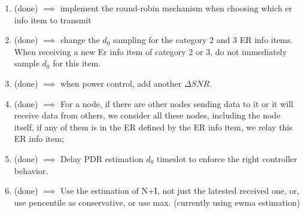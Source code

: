 \begin{enumerate}
\item (done) $\implies$ implement the round-robin mechanism when choosing which er info item to transmit
\item (done) $\implies$ change the $d_0$ sampling for the category 2 and 3 ER info items. When receiving a new Er info item of category 2 or 3, do not immediately sample $d_0$ for this item.
\item (done) $\implies$ when power control, add another $\Delta SNR$.
\item (done) $\implies$ For a node, if there are other nodes sending data to it or it will receive data from others, we consider all these nodes, including the node itself, if any of them is in the ER defined by the ER info item, we relay this ER info item;
\item (done) $\implies$ Delay PDR estimation $d_0$ timeslot to enforce the right controller behavior.
\item (done) $\implies$ Use the estimation of N+I, not just the latested received one, or, use pencentile as conservative, or use max. (currently using ewma estimation)


\end{enumerate}
